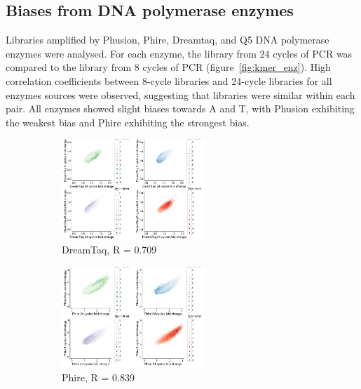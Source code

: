 \documentclass[parskip=full, numbers=noenddot]{scrreprt}
\begin{document}
\subsection{Biases from DNA polymerase enzymes}
\label{ssec:pcrbias_result_enz}

Libraries amplified by Phusion, Phire, Dreamtaq, and Q5 DNA polymerase enzymes were analysed.  For each enzyme, the library from 24 cycles of PCR was compared to the library from 8 cycles of PCR (figure~\ref{fig:kmer_enz}).  High correlation coefficients between 8-cycle libraries and 24-cycle libraries for all enzymes sources were observed, suggesting that libraries were similar within each pair.  All enzymes showed slight biases towards A and T, with Phusion exhibiting the weakest bias and Phire exhibiting the strongest bias.

\begin{figure}[htb]
  \centering
  \begin{subfigure}[htb]{0.6\textwidth}
    \centering
    \includegraphics[width=0.6\textwidth]{kmer_dreamtaq}
    \caption{DreamTaq, R = 0.709}
    \label{fig:kmer_enz_dreamtaq}
  \end{subfigure}
  \begin{subfigure}[htb]{0.6\textwidth}
    \centering
    \includegraphics[width=0.6\textwidth]{kmer_phire}
    \caption{Phire, R = 0.839}
    \label{fig:kmer_enz_phire}
  \end{subfigure}
  \begin{subfigure}[htb]{0.6\textwidth}

\end{subfigure}
\end{figure}
\end{document}
